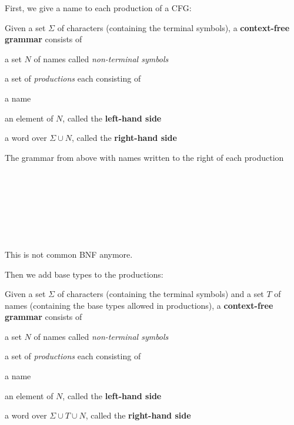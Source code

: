 First, we give a name to each production of a CFG:

\begin{definition}
Given a set $\Sigma$ of characters (containing the terminal symbols), a \textbf{context-free grammar} consists of
\begin{compactitem}
\item a set $N$ of names called \emph{non-terminal symbols}
\item a set of \emph{productions} each consisting of
 \begin{compactitem}
  \item a name
  \item an element of $N$, called the \textbf{left-hand side}
  \item a word over $\Sigma\cup N$, called the \textbf{right-hand side}
 \end{compactitem}
\end{compactitem}
\end{definition}

\begin{example}
The grammar from above with names written to the right of each production
\begin{commgrammar}
\\
\\
\\
\\
\\
\\
\end{commgrammar}
This is not common BNF anymore.
\end{example}

Then we add base types to the productions:

\begin{definition}
Given a set $\Sigma$ of characters (containing the terminal symbols) and a set $T$ of names (containing the base types allowed in productions), a \textbf{context-free grammar} consists of
\begin{compactitem}
\item a set $N$ of names called \emph{non-terminal symbols}
\item a set of \emph{productions} each consisting of
 \begin{compactitem}
  \item a name
  \item an element of $N$, called the \textbf{left-hand side}
  \item a word over $\Sigma\cup T\cup N$, called the \textbf{right-hand side}
 \end{compactitem}
\end{compactitem}
\end{definition}

